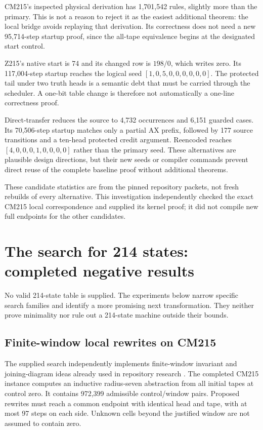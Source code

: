 \documentclass[11pt]{article}
\begin{document}
CM215's inspected physical derivation has 1,701,542 rules, slightly more than the primary. This is not a reason to reject it as the easiest additional theorem: the local bridge avoids replaying that derivation. Its correctness does not need a new 95,714-step startup proof, since the all-tape equivalence begins at the designated start control.

Z215's native start is 74 and its changed row is $198/0$, which writes zero. Its 117,004-step startup reaches the logical seed $[1,0,5,0,0,0,0,0,0]$. The protected tail under two truth heads is a semantic debt that must be carried through the scheduler. A one-bit table change is therefore not automatically a one-line correctness proof.

Direct-transfer reduces the source to 4,732 occurrences and 6,151 guarded cases. Its 70,506-step startup matches only a partial AX prefix, followed by 177 source transitions and a ten-head protected credit argument. Reencoded reaches $[4,0,0,0,1,0,0,0,0]$ rather than the primary seed. These alternatives are plausible design directions, but their new seeds or compiler commands prevent direct reuse of the complete baseline proof without additional theorems.

These candidate statistics are from the pinned repository packets, not fresh rebuilds of every alternative. This investigation independently checked the exact CM215 local correspondence and supplied its kernel proof; it did not compile new full endpoints for the other candidates.

\section{The search for 214 states: completed negative results}

No valid 214-state table is supplied. The experiments below narrow specific search families and identify a more promising next transformation. They neither prove minimality nor rule out a 214-state machine outside their bounds.

\subsection{Finite-window local rewrites on CM215}

The supplied search independently implements finite-window invariant and joining-diagram ideas already used in repository research \cite{priorsearch}. The completed CM215 instance computes an inductive radius-seven abstraction from all initial tapes at control zero. It contains 972,399 admissible control/window pairs. Proposed rewrites must reach a common endpoint with identical head and tape, with at most 97 steps on each side. Unknown cells beyond the justified window are not assumed to contain zero.
\end{document}
